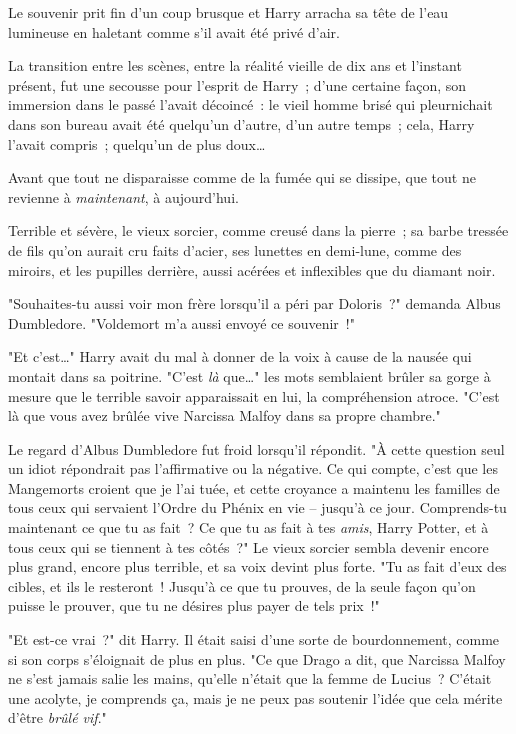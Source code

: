 \later

Le souvenir prit fin d'un coup brusque et Harry arracha sa tête de l'eau lumineuse en haletant comme s'il avait été privé d'air.

La transition entre les scènes, entre la réalité vieille de dix ans et l'instant présent, fut une secousse pour l'esprit de Harry~; d'une certaine façon, son immersion dans le passé l'avait décoincé~: le vieil homme brisé qui pleurnichait dans son bureau avait été quelqu'un d'autre, d'un autre temps~; cela, Harry l'avait compris~; quelqu'un de plus doux…

Avant que tout ne disparaisse comme de la fumée qui se dissipe, que tout ne revienne à \emph{maintenant}, à aujourd'hui.

Terrible et sévère, le vieux sorcier, comme creusé dans la pierre~; sa barbe tressée de fils qu'on aurait cru faits d'acier, ses lunettes en demi-lune, comme des miroirs, et les pupilles derrière, aussi acérées et inflexibles que du diamant noir.

"Souhaites-tu aussi voir mon frère lorsqu'il a péri par Doloris~?" demanda Albus Dumbledore. "Voldemort m'a aussi envoyé ce souvenir~!"

"Et c'est…" Harry avait du mal à donner de la voix à cause de la nausée qui montait dans sa poitrine. "C'est \emph{là} que…" les mots semblaient brûler sa gorge à mesure que le terrible savoir apparaissait en lui, la compréhension atroce. "C'est là que vous avez brûlée vive Narcissa Malfoy dans sa propre chambre."

Le regard d'Albus Dumbledore fut froid lorsqu'il répondit. "À cette question seul un idiot répondrait pas l'affirmative ou la négative. Ce qui compte, c'est que les Mangemorts croient que je l'ai tuée, et cette croyance a maintenu les familles de tous ceux qui servaient l'Ordre du Phénix en vie -- jusqu'à ce jour. Comprends-tu maintenant ce que tu as fait~? Ce que tu as fait à tes \emph{amis}, Harry Potter, et à tous ceux qui se tiennent à tes côtés~?" Le vieux sorcier sembla devenir encore plus grand, encore plus terrible, et sa voix devint plus forte. "Tu as fait d'eux des cibles, et ils le resteront~! Jusqu'à ce que tu prouves, de la seule façon qu'on puisse le prouver, que tu ne désires plus payer de tels prix~!"

"Et est-ce vrai~?" dit Harry. Il était saisi d'une sorte de bourdonnement, comme si son corps s'éloignait de plus en plus. "Ce que Drago a dit, que Narcissa Malfoy ne s'est jamais salie les mains, qu'elle n'était que la femme de Lucius~? C'était une acolyte, je comprends ça, mais je ne peux pas soutenir l'idée que cela mérite d'être \emph{brûlé vif}."

